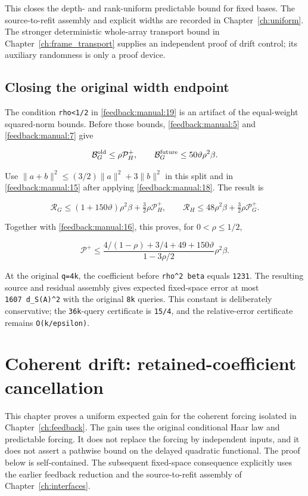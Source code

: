 \documentclass[11pt,oneside,openany,a4paper]{book}
\numberwithin{equation}{chapter}
\theoremstyle{definition}
\theoremstyle{remark}
\newcommand{\T}{\mathsf T}\newcommand{\Id}{I}
\newcommand{\F}[1]{\left\lVert#1\right\rVert_F}
\DeclareMathOperator{\tr}{tr}\DeclareMathOperator{\rank}{rank}
\begin{document}
This closes the depth- and rank-uniform predictable bound for fixed bases. The source-to-refit assembly and explicit widths are recorded in Chapter~\ref{ch:uniform}. The stronger deterministic whole-array transport bound in Chapter~\ref{ch:frame_transport} supplies an independent proof of drift control; its auxiliary randomness is only a proof device.

\section{Closing the original width endpoint}\label{feedback:closing-the-original-width-endpoint}

The condition \texttt{rho\textless{}1/2} in \eqref{feedback:manual:19} is an artifact of the equal-weight squared-norm bounds. Before those bounds, \eqref{feedback:manual:5} and \eqref{feedback:manual:7} give

\[
\mathcal B_G^{\rm old}\le\rho\mathcal P_H^+,
\qquad \mathcal B_G^{\rm future}\le50\vartheta\rho^2\beta.
\]

Use \(\|a+b\|^2\le(3/2)\|a\|^2+3\|b\|^2\) in this split and in \eqref{feedback:manual:15} after applying \eqref{feedback:manual:18}. The result is

\[
\mathcal R_G\le(1+150\vartheta)\rho^2\beta+\tfrac32\rho\mathcal P_H^+,
\qquad
\mathcal R_H\le48\rho^2\beta+\tfrac32\rho\mathcal P_G^+.
\]

Together with \eqref{feedback:manual:16}, this proves, for \(0<\rho\le1/2\),

\[
\boxed{\mathcal P^+\le
\frac{4/(1-\rho)+3/4+49+150\vartheta}{1-3\rho/2}\rho^2\beta.}
\tag{\thechapter.20}\label{feedback:manual:20}
\]

At the original \texttt{q=4k}, the coefficient before \texttt{rho\^{}2\ beta} equals \texttt{1231}. The resulting source and residual assembly gives expected fixed-space error at most \texttt{1607\ d\_S(A)\^{}2} with the original \texttt{8k} queries. This constant is deliberately conservative; the \texttt{36k}-query certificate is \texttt{15/4}, and the relative-error certificate remains \texttt{O(k/epsilon)}.

\endgroup

\begingroup
\let\E\relax
\newcommand{\E}{\mathbb E}
\let\T\relax
\newcommand{\T}{\mathsf T}
\let\F\relax
\newcommand{\F}[1]{\lVert#1\rVert_F}
\let\tr\relax
\newcommand{\tr}{\operatorname{tr}}
\chapter{Coherent drift: retained-coefficient cancellation}\label{ch:drift}
This chapter proves a uniform expected gain for the coherent forcing isolated
in Chapter~\ref{ch:feedback}. The gain uses the original
conditional Haar law and predictable forcing. It does not replace the
forcing by independent inputs, and it does not assert a pathwise bound
on the delayed quadratic functional. The proof below is self-contained.
The subsequent fixed-space consequence explicitly uses the earlier
feedback reduction and the source-to-refit assembly of Chapter~\ref{ch:interfaces}.
\end{document}
